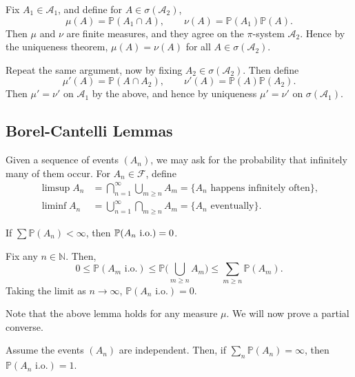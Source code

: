 \documentclass[12pt]{article}
\begin{document}
\begin{proofbox}
	Fix $A_1 \in \mathcal{A}_1$, and define for $A \in \sigma(\mathcal{A}_2)$,
	\[
	\mu(A) = \mathbb{P}(A_1 \cap A), \qquad \nu(A) = \mathbb{P}(A_1) \mathbb{P}(A).
	\]
	Then $\mu$ and $\nu$ are finite measures, and they agree on the $\pi$-system $\mathcal{A}_2$. Hence by the uniqueness theorem, $\mu(A) = \nu(A)$ for all $A \in \sigma(\mathcal{A}_2)$.

	Repeat the same argument, now by fixing $A_2 \in \sigma(\mathcal{A}_2)$. Then define
	\[
	\mu'(A) = \mathbb{P}(A \cap A_2), \qquad \nu'(A) = \mathbb{P}(A) \mathbb{P}(A_2).
	\]
	Then $\mu' = \nu'$ on $\mathcal{A}_1$ by the above, and hence by uniqueness $\mu' = \nu'$ on $\sigma(\mathcal{A}_1)$.
\end{proofbox}

\subsection{Borel-Cantelli Lemmas}
\label{sub:borel_cantelli}

Given a sequence of events $(A_n)$, we may ask for the probability that infinitely many of them occur. For $A_n \in \mathcal{F}$, define
\begin{align*}
	\limsup A_n &= \bigcap_{n = 1}^{\infty} \bigcup_{m \geq n} A_m = \{A_n \text{ happens infinitely often}\}, \\
	\liminf A_n &= \bigcup_{n = 1}^{\infty} \bigcap_{m \geq n} A_m = \{A_n \text{ eventually}\}.
\end{align*}

\begin{lemma}
	If $\sum \mathbb{P}(A_n) < \infty$, then $\mathbb{P}(A_n \text{\normalfont{ i.o.}}) = 0$.
\end{lemma}

\begin{proofbox}
	Fix any $n \in \mathbb{N}$. Then,
	\[
		0 \leq \mathbb{P}(A_m \text{ i.o.}) \leq \mathbb{P}\Biggl( \bigcup_{m \geq n} A_m \Biggr) \leq \sum_{m \geq n} \mathbb{P}(A_m).
	\]
	Taking the limit as $n \to \infty$, $\mathbb{P}(A_n \text{ i.o.}) = 0$.
\end{proofbox}


Note that the above lemma holds for any measure $\mu$. We will now prove a partial converse.

\begin{lemma}
Assume the events $(A_n)$ are independent. Then, if $\sum_n \mathbb{P}(A_n) = \infty$, then $\mathbb{P}(A_n \text{ i.o.}) = 1$.
\end{lemma}
\end{document}
